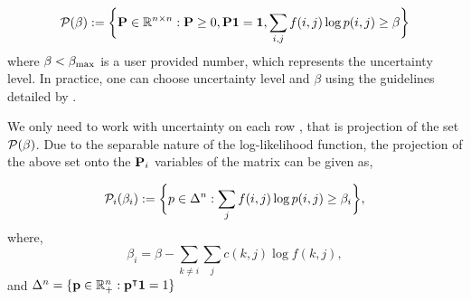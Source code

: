 \begin{equation*}
\mathcal{P}(\beta) := \bigg\{{\mathbf{P}} \in \mathbb{R}^{n \times n}: {\mathbf{P}} \geq 0, {\mathbf{P}} \mathbf{1}=\mathbf{1}, \sum_{i,j}f(i,j)\log{p(i,j)} \geq \beta\bigg\} \label{eq:likelihood_region}
\end{equation*}
where $\beta < \beta_{\textrm{max}}$ is a user provided number, which represents the uncertainty level. In practice, one can choose uncertainty level and $\beta$ using the guidelines detailed by \citet{nilim2004robustness}.

We only need to work with uncertainty on each row {\truetransitionmatrix}, that is projection of the set $\mathcal{P}(\beta)$. Due to the separable nature of the log-likelihood function, the projection of the above set onto the ${\mathbf{P}}_i$ variables of the matrix {\truetransitionmatrix} can be given as,

\begin{equation*}
\mathcal{P}_i(\beta_i) := \bigg\{p \in \Delta^n : \sum_{j}f(i,j)\log{p(i,j)} \geq \beta_i \bigg\},
\end{equation*}
where,
\begin{equation*}
\beta_i = \beta - \sum_{k \neq i}\sum_{j}c(k,j)\log{f(k,j)},
\end{equation*}
and  $\Delta^n = \{\mathbf{p} \in \mathbb{R}^n_+ : \mathbf{p}^\intercal \mathbf{1} = 1 \}$

\fi

